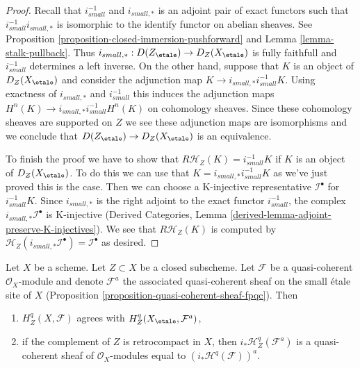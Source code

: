 \begin{proof}
Recall that $i_{small}^{-1}$ and $i_{small, *}$ is an adjoint pair of
exact functors such that $i_{small}^{-1}i_{small, *}$ is isomorphic to
the identify functor on abelian sheaves. See
Proposition \ref{proposition-closed-immersion-pushforward} and
Lemma \ref{lemma-stalk-pullback}. Thus
$i_{small, *} : D(Z_\etale) \to D_Z(X_\etale)$ is fully faithfull and
$i_{small}^{-1}$ determines
a left inverse. On the other hand, suppose that $K$ is an object of
$D_Z(X_\etale)$ and consider the adjunction map
$K \to i_{small, *}i_{small}^{-1}K$.
Using exactness of $i_{small, *}$ and $i_{small}^{-1}$
this induces the adjunction maps
$H^n(K) \to i_{small, *}i_{small}^{-1}H^n(K)$ on cohomology sheaves.
Since these cohomology
sheaves are supported on $Z$ we see these adjunction maps are isomorphisms
and we conclude that $D(Z_\etale) \to D_Z(X_\etale)$ is an equivalence.

\medskip\noindent
To finish the proof we have to show that $R\mathcal{H}_Z(K) = i_{small}^{-1}K$
if $K$ is an object of $D_Z(X_\etale)$. To do this we can use that
$K = i_{small, *}i_{small}^{-1}K$
as we've just proved this is the case. Then we
can choose a K-injective representative $\mathcal{I}^\bullet$ for
$i_{small}^{-1}K$.
Since $i_{small, *}$ is the right adjoint to the exact functor
$i_{small}^{-1}$, the
complex $i_{small, *}\mathcal{I}^\bullet$ is K-injective
(Derived Categories, Lemma \ref{derived-lemma-adjoint-preserve-K-injectives}).
We see that $R\mathcal{H}_Z(K)$ is computed by
$\mathcal{H}_Z(i_{small, *}\mathcal{I}^\bullet) = \mathcal{I}^\bullet$
as desired.
\end{proof}

\begin{lemma}
\label{lemma-cohomology-with-support-quasi-coherent}
Let $X$ be a scheme. Let $Z \subset X$ be a closed subscheme.
Let $\mathcal{F}$ be a quasi-coherent $\mathcal{O}_X$-module
and denote $\mathcal{F}^a$ the associated quasi-coherent sheaf
on the small \'etale site of $X$
(Proposition \ref{proposition-quasi-coherent-sheaf-fpqc}). Then
\begin{enumerate}
\item $H^q_Z(X, \mathcal{F})$ agrees with $H^q_Z(X_\etale, \mathcal{F}^a)$,
\item if the complement of $Z$ is retrocompact in $X$, then
$i_*\mathcal{H}^q_Z(\mathcal{F}^a)$ is a quasi-coherent sheaf of
$\mathcal{O}_X$-modules equal to $(i_*\mathcal{H}^q(\mathcal{F}))^a$.
\end{enumerate}
\end{lemma}

